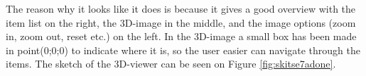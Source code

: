 The reason why it looks like it does is because it gives a good overview with the item list on the right, the 3D-image in the middle, and the image options (zoom in, zoom out, reset etc.) on the left.
In the 3D-image a small box has been made in point(0;0;0) to indicate where it is, so the user easier can navigate through the items.
The sketch of the 3D-viewer can be seen on Figure \ref{fig:skitse7adone}.